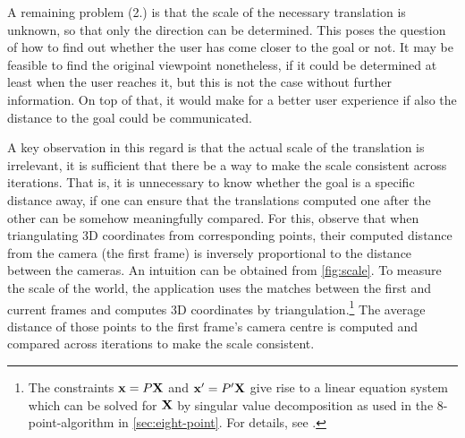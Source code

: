 A remaining problem (2.) is that the scale of the necessary translation is
unknown, so that only the direction can be determined. This poses the question
of how to find out whether the user has come closer to the goal or not. It may
be feasible to find the original viewpoint nonetheless, if it could be
determined at least when the user reaches it, but this is not the case without
further information. On top of that, it would make for a better user experience
if also the distance to the goal could be communicated.

A key observation in this regard is that the actual scale of the translation is
irrelevant, it is sufficient that there be a way to make the scale consistent
across iterations. That is, it is unnecessary to know whether the goal is a
specific distance away, if one can ensure that the translations computed one
after the other can be somehow meaningfully compared. For this, \citet{bae2010}
observe that when triangulating 3D coordinates from corresponding points, their
computed distance from the camera (the first frame) is inversely proportional
to the distance between the cameras. An intuition can be obtained from
\autoref{fig:scale}. To measure the scale of the world, the application uses the
matches between the first and current frames and computes 3D coordinates by
triangulation.\footnote{The constraints $\mathbf{x} = P\mathbf{X}$ and $\mathbf{x}^\prime =
P^\prime\mathbf{X}$ give rise to a linear equation system which can be solved for
$\mathbf{X}$ by singular value decomposition as used in the 8-point-algorithm in \autoref{sec:eight-point}.
For details, see \citep[ch. 12.2]{h&z2004}.} The
average distance of those points to the first frame's camera centre is computed
and compared across iterations to make the scale consistent.

